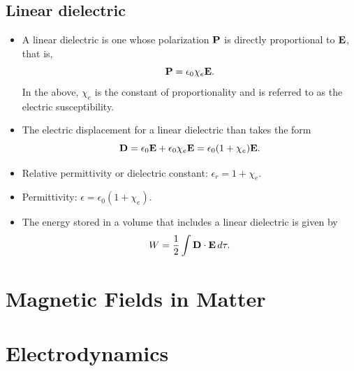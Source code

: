\documentclass[a4paper,11pt]{report}
\begin{document}
\subsection{Linear dielectric}
\begin{itemize}
    \item A linear dielectric is one whose polarization $\mathbf{P}$ is directly proportional to $\mathbf{E}$, that is,
    \begin{equation}
        \mathbf{P} = \epsilon_0 \chi_e \mathbf{E}.
    \end{equation}
    In the above, $\chi_e$ is the constant of proportionality and is referred to as the electric susceptibility.
    \item The electric displacement for a linear dielectric than takes the form
    \begin{equation}
        \mathbf{D} = \epsilon_0 \mathbf{E} + \epsilon_0 \chi_e \mathbf{E} = \epsilon_0 (1 + \chi_e) \mathbf{E}.
    \end{equation}
    \item Relative permittivity or dielectric constant: $\epsilon_r = 1 + \chi_e$.
    \item Permittivity: $\epsilon = \epsilon_0 (1 + \chi_e)$.
    \item The energy stored in a volume that includes a linear dielectric is given by
    \begin{equation}
        W = \frac{1}{2} \int \mathbf{D} \cdot \mathbf{E} \, d\tau.
    \end{equation}
\end{itemize}


\section{Magnetic Fields in Matter}

\section{Electrodynamics}

\end{document}
